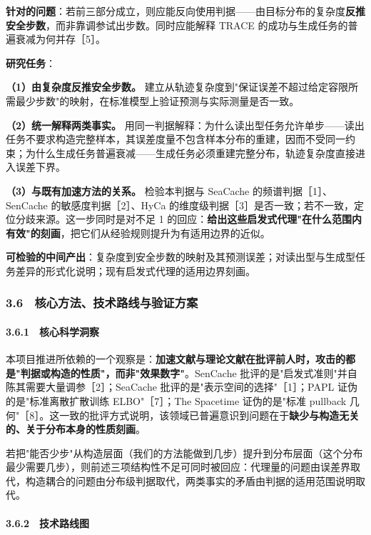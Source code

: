 \documentclass[12pt,a4paper]{ctexart}
\begin{document}
\textbf{针对的问题}：若前三部分成立，则应能反向使用判据——由目标分布的复杂度\textbf{反推安全步数}，而非靠调参试出步数。同时应能解释 TRACE 的成功与生成任务的普遍衰减为何并存［5］。

\textbf{研究任务}：

\textbf{（1）由复杂度反推安全步数。} 建立从轨迹复杂度到"保证误差不超过给定容限所需最少步数"的映射，在标准模型上验证预测与实际测量是否一致。

\textbf{（2）统一解释两类事实。} 用同一判据解释：为什么读出型任务允许单步——读出任务不要求构造完整样本，其误差度量不包含样本分布的重建，因而不受同一约束；为什么生成任务普遍衰减——生成任务必须重建完整分布，轨迹复杂度直接进入误差下界。

\textbf{（3）与既有加速方法的关系。} 检验本判据与 SeaCache 的频谱判据［1］、SenCache 的敏感度判据［2］、HyCa 的维度级判据［3］是否一致；若不一致，定位分歧来源。这一步同时是对不足 1 的回应：\textbf{给出这些启发式代理"在什么范围内有效"的刻画}，把它们从经验规则提升为有适用边界的近似。

\textbf{可检验的中间产出}：复杂度到安全步数的映射及其预测误差；对读出型与生成型任务差异的形式化说明；现有启发式代理的适用边界刻画。

\subsubsection*{3.6　核心方法、技术路线与验证方案}

\paragraph{3.6.1　核心科学洞察}

本项目推进所依赖的一个观察是：\textbf{加速文献与理论文献在批评前人时，攻击的都是"判据或构造的性质"，而非"效果数字"}。SenCache 批评的是"启发式准则"并自陈其需要大量调参［2］；SeaCache 批评的是"表示空间的选择"［1］；PAPL 证伪的是"标准离散扩散训练 ELBO"［7］；The Spacetime 证伪的是"标准 pullback 几何"［8］。这一致的批评方式说明，该领域已普遍意识到问题在于\textbf{缺少与构造无关的、关于分布本身的性质刻画}。

若把"能否少步"从构造层面（我们的方法能做到几步）提升到分布层面（这个分布最少需要几步），则前述三项结构性不足可同时被回应：代理量的问题由误差界取代，构造耦合的问题由分布级判据取代，两类事实的矛盾由判据的适用范围说明取代。

\paragraph{3.6.2　技术路线图}
\end{document}
